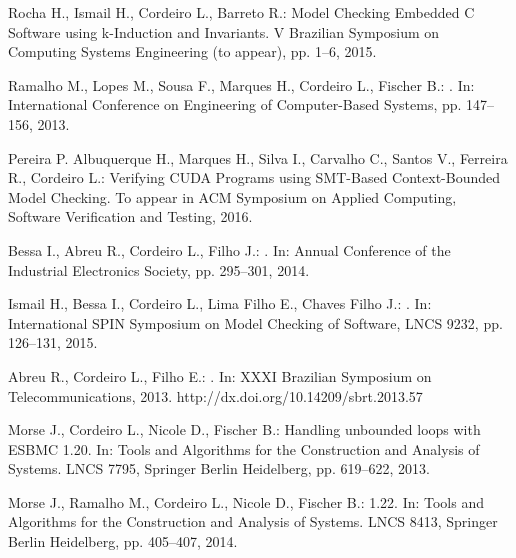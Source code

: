\documentclass{acm_sen_article}
\begin{document}
\begin{thebibliography}{1}
Rocha H., Ismail H., Cordeiro L., Barreto R.:
\newblock Model Checking Embedded C Software using k-Induction and Invariants. 
\newblock V Brazilian Symposium on Computing Systems Engineering (to appear), pp. 1--6, 2015.

Ramalho M., Lopes M., Sousa F., Marques H., Cordeiro L., Fischer B.:
.
\newblock In: International Conference on Engineering of Computer-Based Systems, pp. 147--156, 2013.

Pereira P.  Albuquerque H., Marques H., Silva I., Carvalho C., Santos V., Ferreira R., Cordeiro L.: 
\newblock Verifying CUDA Programs using SMT-Based Context-Bounded Model Checking. 
\newblock To appear in ACM Symposium on Applied Computing, Software Verification and Testing, 2016. 

Bessa I., Abreu R., Cordeiro L., Filho J.:
. 
\newblock In: Annual Conference of the Industrial Electronics Society, pp. 295--301, 2014.

Ismail H., Bessa I., Cordeiro L., Lima Filho E., Chaves Filho J.:
. 
\newblock In: International SPIN Symposium on Model Checking of Software, LNCS 9232, pp. 126--131, 2015.

Abreu R., Cordeiro L., Filho E.:
. 
\newblock In: XXXI Brazilian Symposium on Telecommunications, 2013.
\newblock http://dx.doi.org/10.14209/sbrt.2013.57

Morse J., Cordeiro L., Nicole D., Fischer B.:
\newblock Handling unbounded loops with {ESBMC} 1.20.
\newblock In: Tools and Algorithms for the Construction and Analysis of
  Systems. LNCS 7795, Springer Berlin Heidelberg, pp. 619--622, 2013.

Morse J., Ramalho M., Cordeiro L., Nicole D., Fischer B.:
 1.22.
\newblock In: Tools and Algorithms for the Construction and Analysis of
  Systems. LNCS 8413, Springer Berlin Heidelberg, pp. 405--407, 2014.

\end{thebibliography}




\end{document}
